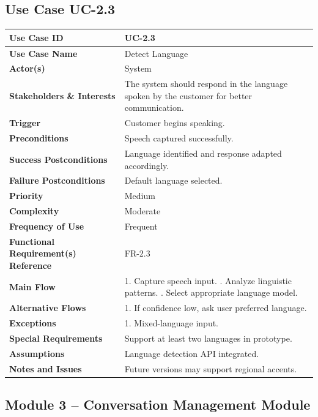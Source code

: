 \documentclass[12pt,a4paper]{report}
\begin{document}
\subsection*{Use Case UC-2.3}
\begin{longtable}{|p{4cm}|p{9cm}|}
\hline
\textbf{Use Case ID} & UC-2.3 \\ \hline
\textbf{Use Case Name} & Detect Language \\ \hline
\textbf{Actor(s)} & System \\ \hline
\textbf{Stakeholders \& Interests} & The system should respond in the language spoken by the customer for better communication. \\ \hline
\textbf{Trigger} & Customer begins speaking. \\ \hline
\textbf{Preconditions} & Speech captured successfully. \\ \hline
\textbf{Success Postconditions} & Language identified and response adapted accordingly. \\ \hline
\textbf{Failure Postconditions} & Default language selected. \\ \hline
\textbf{Priority} & Medium \\ \hline
\textbf{Complexity} & Moderate \\ \hline
\textbf{Frequency of Use} & Frequent \\ \hline
\textbf{Functional Requirement(s) Reference} & FR-2.3 \\ \hline
\textbf{Main Flow} &
1. Capture speech input. \newline
2. Analyze linguistic patterns. \newline
3. Select appropriate language model. \\ \hline
\textbf{Alternative Flows} &
1. If confidence low, ask user preferred language. \\ \hline
\textbf{Exceptions} &
1. Mixed-language input. \\ \hline
\textbf{Special Requirements} &
Support at least two languages in prototype. \\ \hline
\textbf{Assumptions} &
Language detection API integrated. \\ \hline
\textbf{Notes and Issues} &
Future versions may support regional accents. \\ \hline
\end{longtable}

\subsection{Module 3 – Conversation Management Module}
\end{document}
